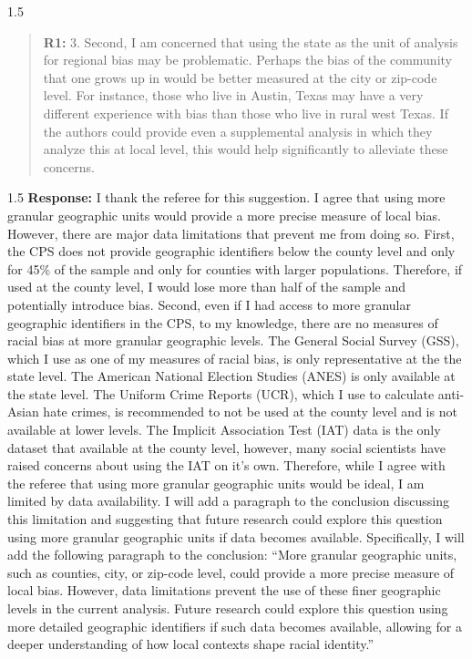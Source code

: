 \documentclass[12pt,english]{article}
\newcommand{\rrxspc}{1.5}
\begin{document}
\begin{refsection}
    \begin{spacing}{\rrxspc}
        \begin{quotation}
            \textbf{R1: } 3. Second, I am concerned that using the state as the unit of analysis for regional bias may be problematic. Perhaps the bias of the community that one grows up in would be better measured at the city or zip-code level. For instance, those who live in Austin, Texas may have a very different experience with bias than those who live in rural west Texas. If the authors could provide even a supplemental analysis in which they analyze this at local level, this would help significantly to alleviate these concerns.
    \end{quotation}
        \end{spacing}
            
    \begin{spacing}{\rrxspc}
            \textbf{Response:} I thank the referee for this suggestion. I agree that using more granular geographic units would provide a more precise measure of local bias. However, there are major data limitations that prevent me from doing so. First, the CPS does not provide geographic identifiers below the county level and only for 45\% of the sample and only for counties with larger populations. Therefore, if used at the county level, I would lose more than half of the sample and potentially introduce bias. Second, even if I had access to more granular geographic identifiers in the CPS, to my knowledge, there are no measures of racial bias at more granular geographic levels. The General Social Survey (GSS), which I use as one of my measures of racial bias, is only representative at the the state level. The American National Election Studies (ANES) is only available at the state level. The Uniform Crime Reports (UCR), which I use to calculate anti-Asian hate crimes, is recommended to not be used at the county level and is not available at lower levels. The Implicit Association Test (IAT) data is the only dataset that available at the county level, however, many social scientists have raised concerns about using the IAT on it's own. Therefore, while I agree with the referee that using more granular geographic units would be ideal, I am limited by data availability. I will add a paragraph to the conclusion discussing this limitation and suggesting that future research could explore this question using more granular geographic units if data becomes available. Specifically, I will add the following paragraph to the conclusion: ``More granular geographic units, such as counties, city, or zip-code level, could provide a more precise measure of local bias. However, data limitations prevent the use of these finer geographic levels in the current analysis. Future research could explore this question using more detailed geographic identifiers if such data becomes available, allowing for a deeper understanding of how local contexts shape racial identity.''


\end{spacing}
\end{refsection}
\end{document}
